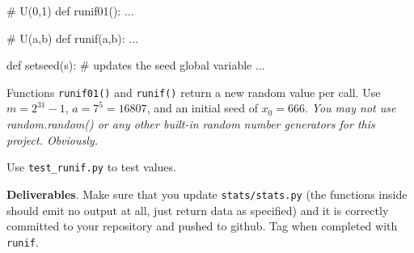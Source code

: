 \begin{fullwidth}
\begin{pyverbatim}
# U(0,1)
def runif01():
    ...

# U(a,b)
def runif(a,b):
    ...

def setseed(s): # updates the seed global variable
    ...
\end{pyverbatim}

Functions {\tt runif01()} and {\tt runif()} return a new random value per call. Use $m = 2^{31} - 1$, $a = 7^5 = 16807$, and an initial seed of $x_0 = 666$.  {\em You may not use random.random() or any other built-in random number generators for this project.  Obviously.}

Use {\tt test\_runif.py} to test values.

\begin{callout}{\bcplume}
{\bf Deliverables}. Make sure that you update {\tt stats/stats.py} (the functions inside should emit no output at all, just return data as specified) and it is correctly committed to your repository and pushed to github. Tag when completed with {\tt runif}.
\end{callout}

\end{fullwidth}
